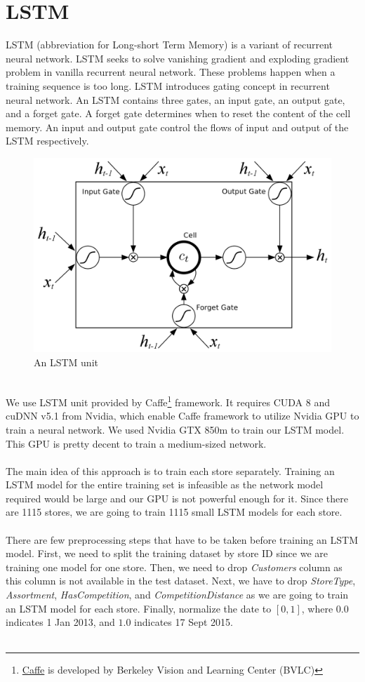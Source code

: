 \section{LSTM}
LSTM (abbreviation for Long-short Term Memory) is a variant of recurrent neural network. LSTM seeks to solve vanishing gradient and exploding gradient problem in vanilla recurrent neural network. These problems happen when a training sequence is too long. LSTM introduces gating concept in recurrent neural network. An LSTM contains three gates, an input gate, an output gate, and a forget gate. A forget gate determines when to reset the content of the cell memory. An input and output gate control the flows of input and output of the LSTM respectively.
\begin{figure}[h]
	\centering
	\includegraphics[width=0.85 \textwidth]{assets/lstm.png}
	\caption{An LSTM unit}
	\label{fig:lstm}
\end{figure} \\
We use LSTM unit provided by Caffe\footnote{\href{https://github.com/BVLC/caffe}{Caffe} is developed by Berkeley Vision and Learning Center (BVLC)} framework. It requires CUDA 8 and cuDNN v5.1 from Nvidia, which enable Caffe framework to utilize Nvidia GPU to train a neural network. We used Nvidia GTX 850m to train our LSTM model. This GPU is pretty decent to train a medium-sized network. \\ \\
The main idea of this approach is to train each store separately. Training an LSTM model for the entire training set is infeasible as the network model required would be large and our GPU is not powerful enough for it. Since there are 1115 stores, we are going to train 1115 small LSTM models for each store. \\ \\
There are few preprocessing steps that have to be taken before training an LSTM model. First, we need to split the training dataset by store ID since we are training one model for one store. Then, we need to drop \textit{Customers} column as this column is not available in the test dataset. Next, we have to drop \textit{StoreType}, \textit{Assortment}, \textit{HasCompetition}, and \textit{CompetitionDistance} as we are going to train an LSTM model for each store. Finally, normalize the date to $[0,1]$, where $0.0$ indicates 1 Jan 2013, and $1.0$ indicates 17 Sept 2015. \\ \\
